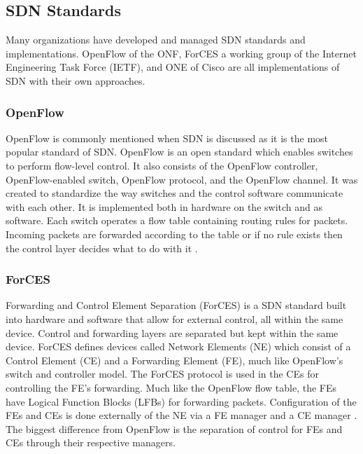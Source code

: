 \documentclass[12pt]{article}
\begin{document}
\subsection{SDN Standards}

Many organizations have developed and managed SDN standards and implementations. OpenFlow of the ONF, ForCES a working group of the Internet Engineering Task Force (IETF), and ONE of Cisco are all implementations of SDN with their own approaches.

\subsubsection{OpenFlow}

OpenFlow \cite{openflow} is commonly mentioned when SDN is discussed as it is the most popular standard of SDN. OpenFlow is an open standard which enables switches to perform flow-level control. It also consists of the OpenFlow controller, OpenFlow-enabled switch, OpenFlow protocol, and the OpenFlow channel. It was created to standardize the way switches and the control software communicate with each other. It is implemented  both in hardware on the switch and as software. Each switch operates a flow table containing routing rules for packets. Incoming packets are forwarded according to the table or if no rule exists then the control layer decides what to do with it \cite{wang2015survey}.

\subsubsection{ForCES}

Forwarding and Control Element Separation (ForCES) \cite{forces} is a SDN standard built into hardware and software that allow for external control, all within the same device. Control and forwarding layers are separated but kept within the same device. ForCES defines devices called Network Elements (NE) which consist of a Control Element (CE) and a Forwarding Element (FE), much like OpenFlow's switch and controller model. The ForCES protocol is used in the CEs for controlling the FE's forwarding. Much like the OpenFlow flow table, the FEs have Logical Function Blocks (LFBs) for forwarding packets. Configuration of the FEs and CEs is done externally of the NE via a FE manager and a CE manager \cite{wang2015survey}. The biggest difference from OpenFlow is the separation of control for FEs and CEs through their respective managers.
\end{document}
